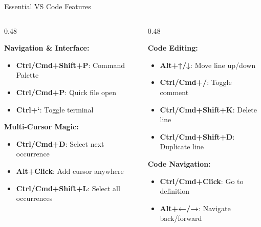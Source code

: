 \documentclass[11pt,aspectratio=169]{beamer}
\begin{document}
\begin{frame}{Essential VS Code Features}
\begin{columns}[t]
\begin{column}{0.48\textwidth}
\begin{minipage}[t][3cm][t]{\textwidth}
\textbf{Navigation \& Interface:}
\begin{itemize}
    \item \textbf{Ctrl/Cmd+Shift+P}: Command Palette
    \item \textbf{Ctrl/Cmd+P}: Quick file open
    \item \textbf{Ctrl+`}: Toggle terminal
\end{itemize}
\end{minipage}

\textbf{Multi-Cursor Magic:}
\begin{itemize}
    \item \textbf{Ctrl/Cmd+D}: Select next occurrence
    \item \textbf{Alt+Click}: Add cursor anywhere
    \item \textbf{Ctrl/Cmd+Shift+L}: Select all occurrences
\end{itemize}
\end{column}

\begin{column}{0.48\textwidth}
\begin{minipage}[t][3cm][t]{\textwidth}
\textbf{Code Editing:}
\begin{itemize}
    \item \textbf{Alt+↑/↓}: Move line up/down
    \item \textbf{Ctrl/Cmd+/}: Toggle comment
    \item \textbf{Ctrl/Cmd+Shift+K}: Delete line
    \item \textbf{Ctrl/Cmd+Shift+D}: Duplicate line
\end{itemize}
\end{minipage}

\textbf{Code Navigation:}
\begin{itemize}
    \item \textbf{Ctrl/Cmd+Click}: Go to definition
    \item \textbf{Alt+←/→}: Navigate back/forward
\end{itemize}
\end{column}
\end{columns}

\end{frame}
\end{document}
